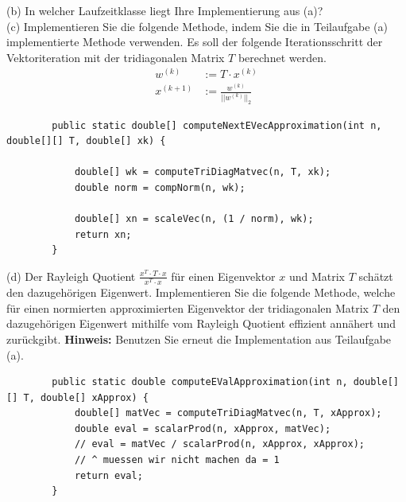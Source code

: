 \documentclass{scrartcl}
\begin{document}
	\lbreak   
	(b)
	In welcher Laufzeitklasse liegt Ihre Implementierung aus (a)?
	\lbreak
	\\
	(c)
	Implementieren Sie die folgende Methode, indem Sie die in Teilaufgabe (a) implementierte Methode verwenden. Es soll der folgende Iterationsschritt der Vektoriteration mit der tridiagonalen Matrix $T$ berechnet werden.
	\begin{align*}
		w^{(k)} &:= T \cdot x^{(k)} \\
		x^{(k+1)} &:= \frac{w^{(k)}}{||w^{(k)}||_2}
	\end{align*}
	\begin{lstlisting}
		public static double[] computeNextEVecApproximation(int n, double[][] T, double[] xk) {
			
			double[] wk = computeTriDiagMatvec(n, T, xk);
			double norm = compNorm(n, wk);
			
			double[] xn = scaleVec(n, (1 / norm), wk);
			return xn;
		}
	\end{lstlisting}
	\lbreak
	(d)
	Der Rayleigh Quotient $\frac{x^T \cdot T \cdot x}{x^T \cdot x}$ für einen Eigenvektor $x$ und Matrix $T$ schätzt den dazugehörigen Eigenwert.
	\n 
	Implementieren Sie die folgende Methode, welche für einen normierten approximierten Eigenvektor der tridiagonalen Matrix $T$ den dazugehörigen Eigenwert mithilfe vom Rayleigh Quotient effizient annähert und zurückgibt.
	\n 
	\textbf{Hinweis:} Benutzen Sie erneut die Implementation aus Teilaufgabe (a).
	\begin{lstlisting}
		public static double computeEValApproximation(int n, double[][] T, double[] xApprox) {
			double[] matVec = computeTriDiagMatvec(n, T, xApprox);
			double eval = scalarProd(n, xApprox, matVec);
			// eval = matVec / scalarProd(n, xApprox, xApprox);
			// ^ muessen wir nicht machen da = 1
			return eval;
		}
	\end{lstlisting}
	
	
\end{document}
